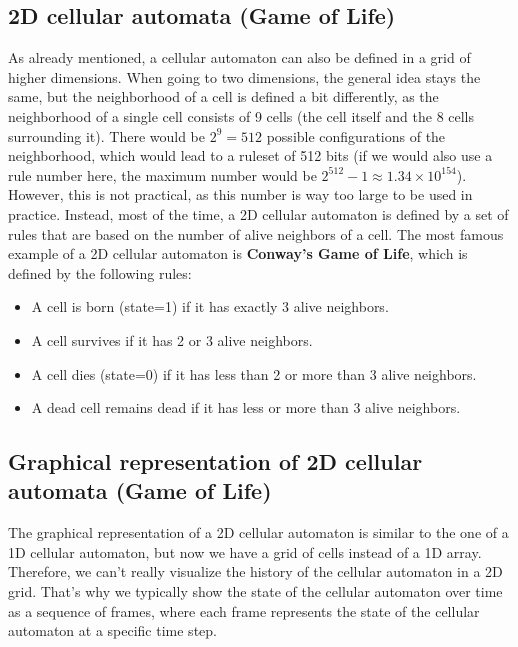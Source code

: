 \documentclass[a4paper,12pt]{llncs}
\numberwithin{equation}{section}
\begin{document}
\subsection{2D cellular automata (Game of Life)}
As already mentioned, a cellular automaton can also be defined in a grid of higher dimensions.
When going to two dimensions, the general idea stays the same, but the neighborhood of a cell is defined a bit differently, as the neighborhood of a single cell consists of 9 cells (the cell itself and the 8 cells surrounding it).
There would be $2^9=512$ possible configurations of the neighborhood, which would lead to a ruleset of 512 bits (if we would also use a rule number here, the maximum number would be $2^{512} - 1 \approx 1.34 \times 10^{154}$).
However, this is not practical, as this number is way too large to be used in practice.
Instead, most of the time, a 2D cellular automaton is defined by a set of rules that are based on the number of alive neighbors of a cell.
The most famous example of a 2D cellular automaton is \textbf{Conway's Game of Life}, which is defined by the following rules:
\begin{itemize}
  \item A cell is born (state=1) if it has exactly 3 alive neighbors.
  \item A cell survives if it has 2 or 3 alive neighbors.
  \item A cell dies (state=0) if it has less than 2 or more than 3 alive neighbors.
  \item A dead cell remains dead if it has less or more than 3 alive neighbors.
\end{itemize}
\subsection{Graphical representation of 2D cellular automata (Game of Life)}
\label{sec:cellular-automata-graphical-2d}
The graphical representation of a 2D cellular automaton is similar to the one of a 1D cellular automaton, but now we have a grid of cells instead of a 1D array.
Therefore, we can't really visualize the history of the cellular automaton in a 2D grid.
That's why we typically show the state of the cellular automaton over time as a sequence of frames, where each frame represents the state of the cellular automaton at a specific time step.
\end{document}
